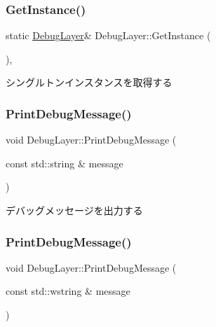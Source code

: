 \subsubsection{\texorpdfstring{Get\+Instance()}{GetInstance()}}
{\footnotesize\ttfamily static \mbox{\hyperlink{class_debug_layer}{Debug\+Layer}}\& Debug\+Layer\+::\+Get\+Instance (\begin{DoxyParamCaption}{ }\end{DoxyParamCaption})\hspace{0.3cm}{\ttfamily [inline]}, {\ttfamily [static]}}



シングルトンインスタンスを取得する 

\mbox{\label{class_debug_layer_ae7d923632d5bcb7144a353a058d8c399}} 
\subsubsection{\texorpdfstring{Print\+Debug\+Message()}{PrintDebugMessage()}\hspace{0.1cm}{\footnotesize\ttfamily [1/2]}}
{\footnotesize\ttfamily void Debug\+Layer\+::\+Print\+Debug\+Message (\begin{DoxyParamCaption}\item[{const std\+::string \&}]{message }\end{DoxyParamCaption})}



デバッグメッセージを出力する 

\mbox{\label{class_debug_layer_a44dbc3cf9a953753fb1ebcc1e1452ec2}} 
\subsubsection{\texorpdfstring{Print\+Debug\+Message()}{PrintDebugMessage()}\hspace{0.1cm}{\footnotesize\ttfamily [2/2]}}
{\footnotesize\ttfamily void Debug\+Layer\+::\+Print\+Debug\+Message (\begin{DoxyParamCaption}\item[{const std\+::wstring \&}]{message }\end{DoxyParamCaption})}

